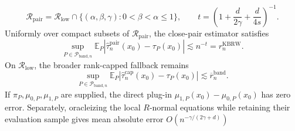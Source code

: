 \[
\mathcal R_{\mathrm{pair}}=\mathcal R_{\mathrm{low}}\cap
\{(\alpha,\beta,\gamma):0<\beta<\alpha\leq1\},
\qquad
t=\left(1+\frac d{2\gamma}+\frac d{4s}\right)^{-1}.
\]
Uniformly over compact subsets of \(\mathcal R_{\mathrm{pair}}\), the close-pair estimator satisfies
\[
\sup_{P\in\mathcal P_{\mathrm{band},n}}
\mathbb E_P\left|\widehat\tau_n^{\mathrm{pair}}(x_0)-\tau_P(x_0)\right|
\lesssim n^{-t}=r_n^{\mathrm{KBRW}}.
\]
On \(\mathcal R_{\mathrm{low}}\), the broader rank-capped fallback remains
\[
\sup_{P\in\mathcal P_{\mathrm{band},n}}
\mathbb E_P\left|\widehat\tau_n^{\mathrm{cap}}(x_0)-\tau_P(x_0)\right|
\lesssim\overline r_n^{\mathrm{band}}.
\]
If \(\pi_P,\mu_{0,P},\mu_{1,P}\) are supplied, the direct plug-in \(\mu_{1,P}(x_0)-\mu_{0,P}(x_0)\) has zero error.  Separately, oracleizing the local \(R\)-normal equations while retaining their evaluation sample gives mean absolute error \(O(n^{-\gamma/(2\gamma+d)})\)